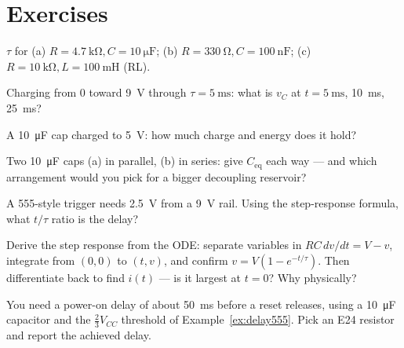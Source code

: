 \section*{Exercises}

\begin{exercise}[easy]
$\tau$ for (a) $R=\qty{4.7}{\kilo\ohm},C=\qty{10}{\micro\farad}$; (b)
$R=\qty{330}{\ohm},C=\qty{100}{\nano\farad}$; (c) $R=\qty{10}{\kilo\ohm},
L=\qty{100}{\milli\henry}$ (RL).
\end{exercise}

\begin{exercise}[easy]
Charging from 0 toward \qty{9}{\volt} through $\tau=\qty{5}{\milli\second}$:
what is $v_C$ at $t=\qty{5}{\milli\second}$, \qty{10}{\milli\second},
\qty{25}{\milli\second}?
\end{exercise}

\begin{exercise}[easy]
A \qty{10}{\micro\farad} cap charged to \qty{5}{\volt}: how much charge and
energy does it hold?
\end{exercise}

\begin{exercise}[easy]
Two \qty{10}{\micro\farad} caps (a) in parallel, (b) in series: give
$C_{\mathrm{eq}}$ each way — and which arrangement would you pick for a
bigger decoupling reservoir?
\end{exercise}

\begin{exercise}[medium]
A 555-style trigger needs \qty{2.5}{\volt} from a \qty{9}{\volt} rail. Using
the step-response formula, what $t/\tau$ ratio is the delay?
\end{exercise}

\begin{exercise}
Derive the step response from the ODE: separate variables in
$RC\,dv/dt = V-v$, integrate from $(0,0)$ to $(t,v)$, and confirm
$v=V(1-e^{-t/\tau})$. Then differentiate back to find $i(t)$ — is it
largest at $t=0$? Why physically?
\end{exercise}

\begin{exercise}
You need a power-on delay of about \qty{50}{\milli\second} before a reset
releases, using a \qty{10}{\micro\farad} capacitor and the $\tfrac23 V_{CC}$
threshold of Example~\ref{ex:delay555}. Pick an E24 resistor and report the
achieved delay.
\end{exercise}

